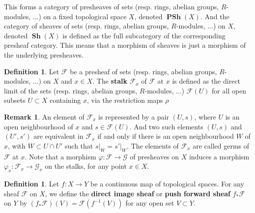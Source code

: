 \documentclass{article}
\theoremstyle{plain}
\theoremstyle{definition}
\newtheorem{definition}[theorem]{Definition}
\newtheorem{remark}{Remark}
\DeclareMathOperator{\Sh}{\textbf{Sh}}
\DeclareMathOperator{\PSh}{\textbf{PSh}}
\begin{document}
\noindent This forms a category of presheaves of sets (resp. rings, abelian groups, $R$-modules, ...) on a fixed topological space $X$, denoted $\PSh(X)$. And the category of sheaves of sets (resp. rings, abelian groups, $R$-modules, ...) on $X$, denoted $\Sh(X)$ is defined as the full subcategory of the corresponding presheaf category. This means that a morphism of sheaves is just a morphism of the underlying presheaves.



\begin{definition}
    Let $\mathcal{F}$ be a presheaf of sets (resp. rings, abelian groups, $R$-modules, ...) on $X$ and $x\in X$. 
    The \textbf{stalk} $\mathcal{F}_x$ of $\mathcal{F}$ at $x$ is defined as the direct limit of the sets (resp. rings, abelian groups, $R$-modules, ...) $\mathcal{F}(U)$ for all open subsets $U\subset X$ containing $x$, via the restriction maps $\rho$
\end{definition}

\begin{remark}
    An element of $\mathcal{F}_x$ is represented by a pair $(U,s)$, where $U$ is an open neighbourhood of $x$ and $s\in\mathcal{F}(U)$. And two such elements $(U,s)$ and $(U',s')$ are equivalent in $\mathcal{F}_x$ if and only if there is an open neighbourhood $W$ of $x$, with $W\subset U\cap U'$ such that $s\vert_W = s'\vert_W$. The elements of $\mathcal{F}_x$ are called germs of $\mathcal{F}$ at $x$.
    Note that a morphism $\varphi: \mathcal{F}\rightarrow\mathcal{G}$ of presheaves on $X$ induces a morphism $\varphi_x:\mathcal{F}_x\rightarrow\mathcal{G}_x$ on the stalks, for any point $x\in X$.
\end{remark}




\begin{definition}
    Let $f:X\rightarrow Y$ be a continuous map of topological spaces. 
    For any sheaf $\mathcal{F}$ on $X$, we define the \textbf{direct image sheaf} or \textbf{push forward sheaf} $f_{*}\mathcal{F}$ on $Y$ by $(f_*\mathcal{F})(V) = \mathcal{F}(f^{-1}(V))$ for any open set $V\subset Y$. 
\end{definition}
\end{document}
